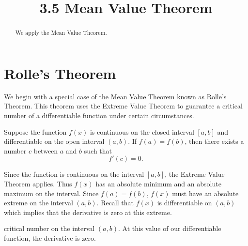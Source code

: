\documentclass[handout]{ximera}
\title{3.5 Mean Value Theorem}
\begin{document}
\begin{abstract}
We apply the Mean Value Theorem.
\end{abstract}

\maketitle

\section{Rolle's Theorem}
We begin with a special case of the Mean Value Theorem known as Rolle's Theorem.
This theorem uses the Extreme Value Theorem to guarantee a critical number of a differentiable function under certain circumstances.

\begin{theorem}
Suppose the function $f(x)$ is continuous on the closed interval $[a,b]$ and differentiable on the open interval $(a,b)$.
If $f(a) = f(b)$, then there exists a number $c$ between $a$ and $b$ such that 
\[
f'(c) = 0.
\]
\end{theorem}

\begin{image}
\end{image}
Since the function is continuous on the interval $[a,b]$, the Extreme Value Theorem applies.
Thus $f(x)$ has an absolute minimum and an absolute maximum on the interval.
Since $f(a) = f(b)$, $f(x)$ must have an absolute extreme on the interval $(a,b)$.
Recall that $f(x)$ is differentiable on $(a,b)$ which implies that the derivative is zero at this extreme.

 critical number on the interval $(a,b)$. 
At this value of our differentiable function, the derivative is zero.
\end{document}
